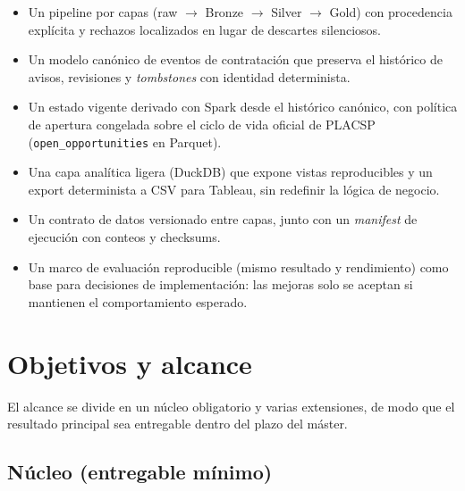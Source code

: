 \documentclass[11pt,a4paper]{article}
\newcommand{\tarrow}{$\rightarrow$}
\begin{document}
\begin{itemize}
  \item Un pipeline por capas (raw \tarrow{} Bronze \tarrow{} Silver \tarrow{} Gold) con procedencia
        explícita y rechazos localizados en lugar de descartes silenciosos.
  \item Un modelo canónico de eventos de contratación que preserva el histórico
        de avisos, revisiones y \emph{tombstones} con identidad determinista.
  \item Un estado vigente derivado con Spark desde el histórico canónico, con
        política de apertura congelada sobre el ciclo de vida oficial de PLACSP
        (\texttt{open\_opportunities} en Parquet).
  \item Una capa analítica ligera (DuckDB) que expone vistas reproducibles y un
        export determinista a CSV para Tableau, sin redefinir la lógica de
        negocio.
  \item Un contrato de datos versionado entre capas, junto con un \emph{manifest}
        de ejecución con conteos y checksums.
  \item Un marco de evaluación reproducible (mismo resultado y
        rendimiento) como base para decisiones de implementación: las mejoras
        solo se aceptan si mantienen el comportamiento esperado.
\end{itemize}

\section{Objetivos y alcance}

El alcance se divide en un núcleo obligatorio y varias extensiones, de modo
que el resultado principal sea entregable dentro del plazo del máster.

\subsection{Núcleo (entregable mínimo)}
\end{document}
